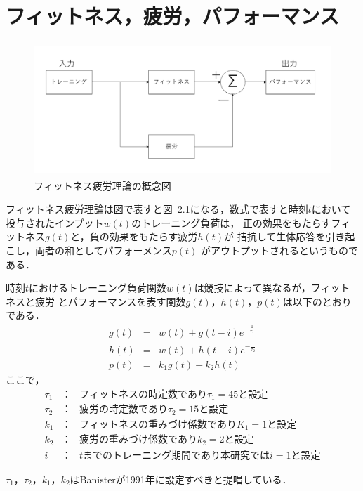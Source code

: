\documentclass[12pt,fleqn]{jreport}
\begin{document}
\section{フィットネス，疲労，パフォーマンス}
\begin{figure}[h]
  \begin{center}
    \includegraphics[width=15cm,height=5cm]{1.png}
  \end{center}
  \caption{フィットネス疲労理論の概念図}
\end{figure}
フィットネス疲労理論\cite{bani}は図で表すと図\ 2.1になる，数式で表すと時刻$t$において投与されたインプット$w(t)$のトレーニング負荷は，
正の効果をもたらすフィットネス$g(t)$と，負の効果をもたらす疲労$h(t)$が
拮抗して生体応答を引き起こし，両者の和としてパフォーメンス$p(t)$
がアウトプットされるというものである．\\
\par 時刻$t$におけるトレーニング負荷関数$w(t)$は競技によって異なるが，フィットネスと疲労
とパフォーマンスを表す関数$g(t)，h(t)，p(t)$は以下のとおりである．
\begin{eqnarray}
  g(t)&=&w(t)+g(t-i)e^{-\frac{1}{\tau_1}}\label{eq:fit1}\\%
  h(t)&=&w(t)+h(t-i)e^{-\frac{1}{\tau_2}}\label{eq:fig1}\\%
  p(t)&=&k_1g(t)-k_2h(t)\label{eq:per1}%
\end{eqnarray}
ここで，
\begin{eqnarray}
  \tau_1&：&フィットネスの時定数であり\tau_1=45と設定\nonumber\\
  \tau_2&：&疲労の時定数であり\tau_2=15と設定\nonumber\\
  k_1&：&フィットネスの重みづけ係数でありK_1=1と設定\nonumber\\
  k_2&：&疲労の重みづけ係数でありk_2=2と設定\nonumber\\
  i&：&tまでのトレーニング期間であり本研究ではi=1と設定\nonumber
\end{eqnarray}

$\tau_1$，$\tau_2$，$k_1$，$k_2$はBanisterが1991年に設定すべきと提唱している\cite{fitfig}．
\end{document}
